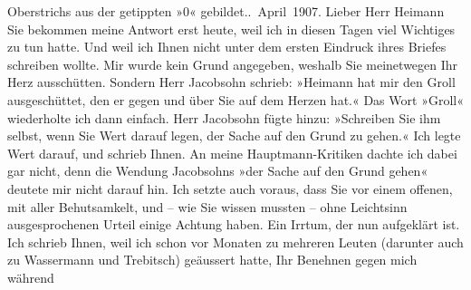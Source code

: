 \begin{ledgroupsized}[t]{13cm}
{{{                        Oberstrichs aus der getippten »0«
                  gebildet.}}}\label{K_L03438-11h}. April 1907.\pend
           \pstart{}Lieber Herr Heimann\pend\pstart
           Sie bekommen meine Antwort erst heute, weil ich in diesen Tagen viel Wichtiges zu tun
               hatte. Und weil ich Ihnen nicht unter dem ersten Eindruck ihres Briefes schreiben
               wollte.\pend
           \pstart
           Mir wurde kein Grund angegeben, weshalb Sie meinetwegen Ihr Herz ausschütten. Sondern
               Herr Jacobsohn schrieb: »Heimann hat mir den Groll ausgeschüttet, den er gegen und
               über Sie auf dem Herzen hat.« Das Wort »Groll« wiederholte ich dann einfach.\pend
           \pstart
           Herr Jacobsohn fügte hinzu: »Schreiben Sie ihm
               selbst, wenn Sie Wert darauf legen, der Sache auf den Grund zu gehen.« Ich legte Wert
               darauf, und schrieb Ihnen. An meine Hauptmann-Kritiken dachte ich dabei
               gar nicht, denn die Wendung Jacobsohns »der
               Sache auf den Grund gehen« deutete mir nicht darauf hin. Ich setzte auch voraus, dass
               Sie vor einem offenen, mit aller Behutsamkelt, und – wie Sie wissen mussten – ohne
               Leichtsinn ausgesprochenen Urteil einige Achtung haben. Ein Irrtum, der nun
               aufgeklärt ist.\pend
           \pstart
           Ich schrieb Ihnen, weil ich schon vor Monaten zu mehreren Leuten (darunter auch zu
                  Wassermann und Trebitsch) geäussert hatte, Ihr Benehnen gegen mich während

\end{ledgroupsized}
